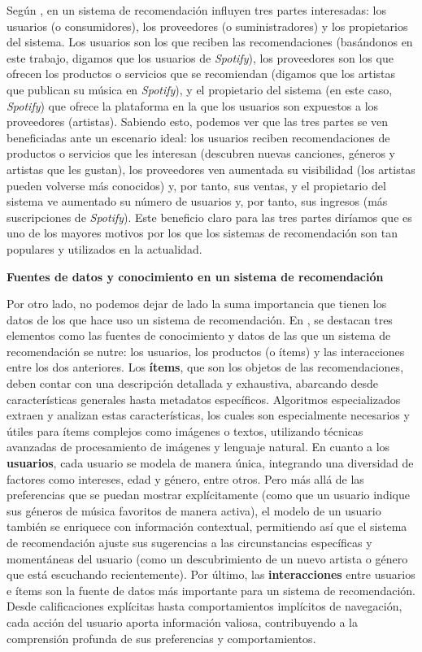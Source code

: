 Según \cite{recommenderintro}, en un sistema de recomendación influyen tres partes interesadas: los usuarios (o consumidores), los proveedores (o suministradores)
y los propietarios del sistema. Los usuarios son los que reciben las recomendaciones (basándonos en este trabajo, digamos que los usuarios de \textit{Spotify}), 
los proveedores son los que ofrecen los productos o servicios que se recomiendan (digamos que los artistas que publican su música en \textit{Spotify}), y
el propietario del sistema (en este caso, \textit{Spotify}) que ofrece la plataforma en la que los usuarios son expuestos a los proveedores (artistas). Sabiendo
esto, podemos ver que las tres partes se ven beneficiadas ante un escenario ideal: los usuarios reciben recomendaciones de productos o servicios que les
interesan (descubren nuevas canciones, géneros y artistas que les gustan), los proveedores ven aumentada su visibilidad (los artistas pueden volverse más
conocidos) y, por tanto, sus ventas, y el propietario del sistema ve aumentado su número de usuarios y, por tanto, sus ingresos (más suscripciones de \textit{Spotify}).
Este beneficio claro para las tres partes diríamos que es uno de los mayores motivos por los que los sistemas de recomendación son tan 
populares y utilizados en la actualidad.

\textbf{Fuentes de datos y conocimiento en un sistema de recomendación}

Por otro lado, no podemos dejar de lado la suma importancia que tienen los datos de los que hace uso un sistema de recomendación. En \cite{recommenderintro}, 
se destacan tres elementos como las fuentes de conocimiento y datos de las que un sistema de recomendación se nutre: los usuarios, los productos (o ítems)
y las interacciones entre los dos anteriores. Los \textbf{ítems}, que son los objetos de las recomendaciones, deben contar con una descripción detallada y exhaustiva, 
abarcando desde características generales hasta metadatos específicos. Algoritmos especializados extraen y analizan estas características, los cuales son
especialmente necesarios y útiles para ítems complejos como imágenes o textos, utilizando técnicas avanzadas de procesamiento de imágenes 
y lenguaje natural.
En cuanto a los \textbf{usuarios}, cada usuario se modela de manera única, integrando una diversidad de factores como intereses, edad y género, entre otros. 
Pero más allá de las preferencias que se puedan mostrar explícitamente (como que un usuario indique sus géneros de música favoritos de manera activa),
el modelo de un usuario también se enriquece con información contextual, permitiendo así que el sistema de recomendación ajuste sus sugerencias a las
circunstancias específicas y momentáneas del usuario (como un descubrimiento de un nuevo artista o género que está escuchando recientemente).
Por último, las \textbf{interacciones} entre usuarios e ítems son la fuente de datos más importante para un sistema de recomendación. Desde calificaciones
explícitas hasta comportamientos implícitos de navegación, cada acción del usuario aporta información valiosa, contribuyendo a la comprensión profunda de 
sus preferencias y comportamientos.

